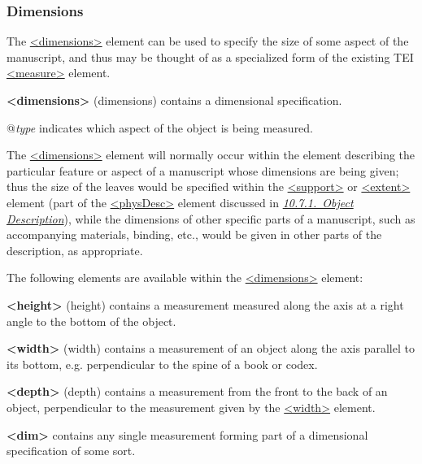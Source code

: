 \subsubsection[{Dimensions}]{Dimensions}\label{msdim}\par
The \hyperref[TEI.dimensions]{<dimensions>} element can be used to specify the size of some aspect of the manuscript, and thus may be thought of as a specialized form of the existing TEI \hyperref[TEI.measure]{<measure>} element. 
\begin{sansreflist}
  
\item [\textbf{<dimensions>}] (dimensions) contains a dimensional specification.\hfil\\[-10pt]\begin{sansreflist}
    \item[@{\itshape type}]
  indicates which aspect of the object is being measured.
\end{sansreflist}  
\end{sansreflist}
\par
The \hyperref[TEI.dimensions]{<dimensions>} element will normally occur within the element describing the particular feature or aspect of a manuscript whose dimensions are being given; thus the size of the leaves would be specified within the \hyperref[TEI.support]{<support>} or \hyperref[TEI.extent]{<extent>} element (part of the \hyperref[TEI.physDesc]{<physDesc>} element discussed in \textit{\hyperref[msph1]{10.7.1.\ Object Description}}), while the dimensions of other specific parts of a manuscript, such as accompanying materials, binding, etc., would be given in other parts of the description, as appropriate.\par
The following elements are available within the \hyperref[TEI.dimensions]{<dimensions>} element: 
\begin{sansreflist}
  
\item [\textbf{<height>}] (height) contains a measurement measured along the axis at a right angle to the bottom of the object.
\item [\textbf{<width>}] (width) contains a measurement of an object along the axis parallel to its bottom, e.g. perpendicular to the spine of a book or codex.
\item [\textbf{<depth>}] (depth) contains a measurement from the front to the back of an object, perpendicular to the measurement given by the \hyperref[TEI.width]{<width>} element.
\item [\textbf{<dim>}] contains any single measurement forming part of a dimensional specification of some sort.
\end{sansreflist}
